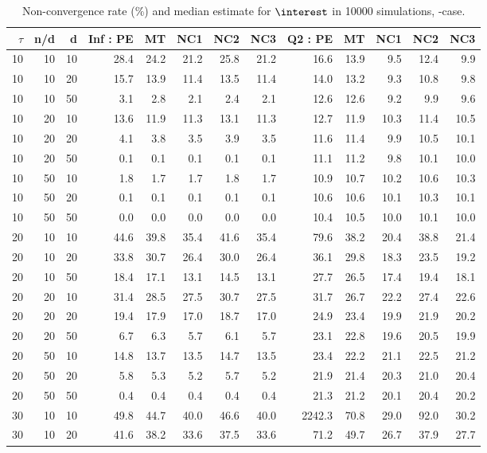 \begin{table}

\caption{\label{tab:summarytmod}Non-convergence rate (\%) and median estimate for $\interest$ in 10000 simulations, \tdist-case.}
\centering
\begin{tabular}[t]{rrrrrrrrrrrrr}
\toprule
$\tau$ & n/d & d & Inf : PE & MT  & NC1  & NC2  & NC3  & Q2 : PE &  MT &  NC1 &  NC2 &  NC3\\
\midrule
10 & 10 & 10 & 28.4 & 24.2 & 21.2 & 25.8 & 21.2 & 16.6 & 13.9 & 9.5 & 12.4 & 9.9\\
10 & 10 & 20 & 15.7 & 13.9 & 11.4 & 13.5 & 11.4 & 14.0 & 13.2 & 9.3 & 10.8 & 9.8\\
10 & 10 & 50 & 3.1 & 2.8 & 2.1 & 2.4 & 2.1 & 12.6 & 12.6 & 9.2 & 9.9 & 9.6\\
10 & 20 & 10 & 13.6 & 11.9 & 11.3 & 13.1 & 11.3 & 12.7 & 11.9 & 10.3 & 11.4 & 10.5\\
10 & 20 & 20 & 4.1 & 3.8 & 3.5 & 3.9 & 3.5 & 11.6 & 11.4 & 9.9 & 10.5 & 10.1\\

10 & 20 & 50 & 0.1 & 0.1 & 0.1 & 0.1 & 0.1 & 11.1 & 11.2 & 9.8 & 10.1 & 10.0\\
10 & 50 & 10 & 1.8 & 1.7 & 1.7 & 1.8 & 1.7 & 10.9 & 10.7 & 10.2 & 10.6 & 10.3\\
10 & 50 & 20 & 0.1 & 0.1 & 0.1 & 0.1 & 0.1 & 10.6 & 10.6 & 10.1 & 10.3 & 10.1\\
10 & 50 & 50 & 0.0 & 0.0 & 0.0 & 0.0 & 0.0 & 10.4 & 10.5 & 10.0 & 10.1 & 10.0\\
20 & 10 & 10 & 44.6 & 39.8 & 35.4 & 41.6 & 35.4 & 79.6 & 38.2 & 20.4 & 38.8 & 21.4\\

20 & 10 & 20 & 33.8 & 30.7 & 26.4 & 30.0 & 26.4 & 36.1 & 29.8 & 18.3 & 23.5 & 19.2\\
20 & 10 & 50 & 18.4 & 17.1 & 13.1 & 14.5 & 13.1 & 27.7 & 26.5 & 17.4 & 19.4 & 18.1\\
20 & 20 & 10 & 31.4 & 28.5 & 27.5 & 30.7 & 27.5 & 31.7 & 26.7 & 22.2 & 27.4 & 22.6\\
20 & 20 & 20 & 19.4 & 17.9 & 17.0 & 18.7 & 17.0 & 24.9 & 23.4 & 19.9 & 21.9 & 20.2\\
20 & 20 & 50 & 6.7 & 6.3 & 5.7 & 6.1 & 5.7 & 23.1 & 22.8 & 19.6 & 20.5 & 19.9\\

20 & 50 & 10 & 14.8 & 13.7 & 13.5 & 14.7 & 13.5 & 23.4 & 22.2 & 21.1 & 22.5 & 21.2\\
20 & 50 & 20 & 5.8 & 5.3 & 5.2 & 5.7 & 5.2 & 21.9 & 21.4 & 20.3 & 21.0 & 20.4\\
20 & 50 & 50 & 0.4 & 0.4 & 0.4 & 0.4 & 0.4 & 21.3 & 21.2 & 20.1 & 20.4 & 20.2\\
30 & 10 & 10 & 49.8 & 44.7 & 40.0 & 46.6 & 40.0 & 2242.3 & 70.8 & 29.0 & 92.0 & 30.2\\
30 & 10 & 20 & 41.6 & 38.2 & 33.6 & 37.5 & 33.6 & 71.2 & 49.7 & 26.7 & 37.9 & 27.7\\


\end{tabular}
\end{table}

